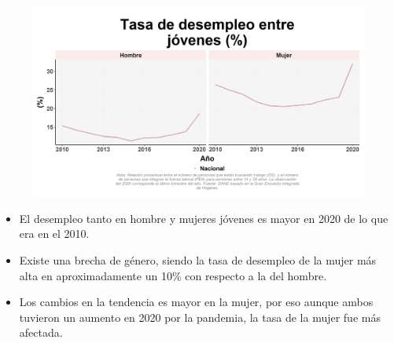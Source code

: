     \begin{figure}[H]
        \caption[Tasa de desempleo joven por género ]{\label{desempjov_gen_trend} }
        \begin{center}
        \includegraphics[width=\textwidth,keepaspectratio]{img/var_55_trend.png}
        \end{center}
    \end{figure}
            \begin{itemize}
                \item El desempleo tanto en hombre y mujeres jóvenes es mayor en 2020 de lo que era en el 2010.
                \item Existe una brecha de género, siendo la tasa de desempleo de la mujer más alta en aproximadamente un 10\% con respecto a la del hombre.
                \item Los cambios en la tendencia es mayor en la mujer, por eso aunque ambos tuvieron un aumento en 2020 por la pandemia, la tasa de la mujer fue más afectada.
                \end{itemize}

